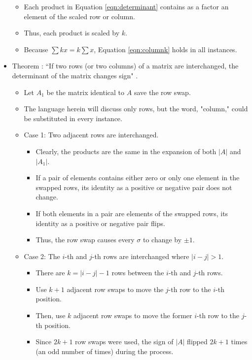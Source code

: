 \documentclass[titlepage]{article}
\newcounter{theorem}
\newcommand{\newtrm}[1]{\refstepcounter{theorem}\label{#1}Theorem \thetheorem: }
\numberwithin{figure}{section}
\numberwithin{equation}{section}
\numberwithin{theorem}{section}
\newcommand{\dq}[4][]{``#2"#1 \cite[#4]{#3}.}
\begin{document}
\begin{itemize}
    \begin{itemize}
        \item Each product in Equation \ref{eqn:determinant} contains as a factor an element of the scaled row or column.
        \item Thus, each product is scaled by $k$.
        \item Because $\sum kx=k\sum x$, Equation \ref{eqn:columnk} holds in all instances.
    \end{itemize}
    \item \newtrm{trm:ijswitch}\dq{If two rows (or two columns) of a matrix are interchanged, the determinant of the matrix changes sign}{bib:determinants}{17}
    \begin{itemize}
        \item Let $A_1$ be the matrix identical to $A$ save the row swap.
        \item The language herein will discuss only rows, but the word, "column," could be substituted in every instance.
        \item Case 1: Two adjacent rows are interchanged.
        \begin{itemize}
            \item Clearly, the products are the same in the expansion of both $|A|$ and $|A_1|$.
            \item If a pair of elements contains either zero or only one element in the swapped rows, its identity as a positive or negative pair does not change.
            \item If both elements in a pair are elements of the swapped rows, its identity as a positive or negative pair flips.
            \item Thus, the row swap causes every $\sigma$ to change by $\pm 1$.
        \end{itemize}
        \item Case 2: The $i$-th and $j$-th rows are interchanged where $|i-j|>1$.
        \begin{itemize}
            \item There are $k=|i-j|-1$ rows between the $i$-th and $j$-th rows.
            \item Use $k+1$ adjacent row swaps to move the $j$-th row to the $i$-th position.
            \item Then, use $k$ adjacent row swaps to move the former $i$-th row to the $j$-th position.
            \item Since $2k+1$ row swaps were used, the sign of $|A|$ flipped $2k+1$ times (an odd number of times) during the process.

\end{itemize}
\end{itemize}
\end{itemize}
\end{document}
